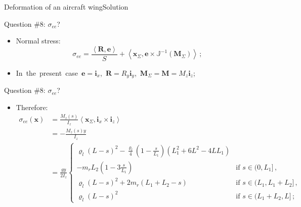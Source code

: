 \documentclass{beamer}
\newcommand{\xj}{x}
\newcommand{\yj}{y}
\newcommand{\zj}{z}
\newcommand{\xv}{{\boldsymbol\xj}}
\newcommand{\ej}{e}
\renewcommand{\ij}{i}
\newcommand{\ev}{{\boldsymbol\ej}}
\newcommand{\iv}{{\boldsymbol\ij}}
\newcommand*{\Mstaticj}{J}
\newcommand*{\Mstatic}{{\mathbb\Mstaticj}}
\newcommand{\roi}{\varrho}
\newcommand*{\stressj}{\sigma}
\newcommand{\Fresj}{R}
\newcommand{\Mresj}{M}
\newcommand{\Fres}{{\boldsymbol\Fresj}}
\newcommand{\Mres}{{\boldsymbol\Mresj}}
\newcommand{\scal}[1]{\left\langle{#1}\right\rangle}
\begin{document}
\begin{frame}{Deformation of an aircraft wing}{Solution}

\begin{overprint}

\vskip-20pt
\begin{exampleblock}{Question \#8: $\stressj_{ee}$?}
\begin{itemize}
\item Normal stress:
\begin{displaymath}
\stressj_{ee}=\frac{\scal{\Fres,\ev}}{S}+\scal{\xv_\Sigma,\ev\times\Mstatic^{-1}(\Mres_\Sigma)}\,;
\end{displaymath}
\item  In~the~present~case~$\ev=\iv_\xj$,~$\Fres=\Fresj_\yj\iv_\yj$,~$\Mres_\Sigma=\Mres=\Mresj_\zj\iv_\zj$;
\end{itemize}
\end{exampleblock}

\vskip-20pt
\begin{exampleblock}{Question \#8: $\stressj_{ee}$?}
\begin{itemize}
\item Therefore:
\begin{displaymath}
\begin{split}
\!\!\!\!\!\!\!\!\!\!\!\!\!\stressj_{ee}(\xv) &=\frac{\Mresj_\zj(s)}{I_\zj}\scal{\xv_\Sigma,\iv_\xj\times\iv_\zj} \\
&=-\frac{\Mresj_\zj(s)\yj}{I_\zj} \\
&= \frac{g\yj}{2I_\zj}\left\{\begin{array}{ll}
\scriptstyle \!\!\!\!\roi_l(L-s)^2-\frac{\roi_l}{4}(1-\frac{s}{L_1})(L_1^2+6L^2-4LL_1) & \\
\scriptstyle  - m_rL_2\left(1-3\frac{s}{L_1}\right) & \scriptstyle\text{if $s\in(0,L_1]$}\,, \\
\scriptstyle \!\!\!\!\roi_l(L-s)^2+2m_r(L_1+L_2-s) & \scriptstyle\text{if $s\in(L_1,L_1+L_2]$}\,, \\
\scriptstyle \!\!\!\!\roi_l(L-s)^2 & \scriptstyle\text{if $s\in(L_1+L_2,L]$}\,;
\end{array}\right.
\end{split}
\end{displaymath}
\end{itemize}
\end{exampleblock}


\end{overprint}
\end{frame}
\end{document}
